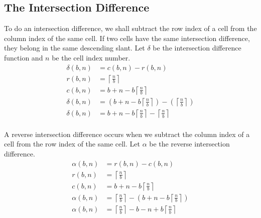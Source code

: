 \documentclass[letterpaper, twoside,12pt]{article}
\begin{document}
    \subsection{The Intersection Difference} \label{intersection_diff}
    To do an intersection difference, we shall subtract the row index of a cell from the column index of the same cell. If two cells have the same intersection difference, they belong in the same descending slant. Let $\delta$ be the intersection difference function and $n$ be the cell index number.
    \begin{equation}
        \begin{split}
            \delta(b,n) &= c(b,n) - r(b,n)\\
            r(b,n) &= \left\lceil \frac{n}{b} \right\rceil \\
            c(b,n) &= b + n - b\left\lceil \frac{n}{b} \right\rceil \\
            \delta(b,n) &= (b + n - b\left\lceil \frac{n}{b} \right\rceil) - (\left\lceil \frac{n}{b} \right\rceil)\\
            \delta(b,n) &= b + n - b\left\lceil \frac{n}{b} \right\rceil - \left\lceil \frac{n}{b} \right\rceil\\
        \end{split}
    \end{equation}

    A reverse intersection difference occurs when we subtract the column index of a cell from the row index of the same cell. Let $\alpha$ be the reverse intersection difference.
    \begin{equation}
        \begin{split}
            \alpha(b,n) &= r(b,n) - c(b,n)\\
            r(b,n) &= \left\lceil \frac{n}{b} \right\rceil \\
            c(b,n) &= b + n - b\left\lceil \frac{n}{b} \right\rceil \\
            \alpha(b,n) &= \left\lceil \frac{n}{b} \right\rceil - (b + n - b\left\lceil \frac{n}{b} \right\rceil)\\
            \alpha(b,n) &= \left\lceil \frac{n}{b} \right\rceil - b - n + b\left\lceil \frac{n}{b} \right\rceil
        \end{split}
    \end{equation}
\end{document}

